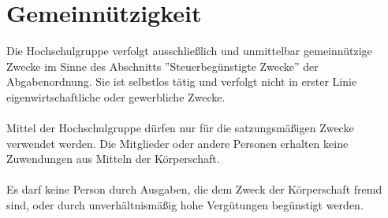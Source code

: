 \documentclass[11pt]{article}
\begin{document}
\section{Gemeinnützigkeit}
Die Hochschulgruppe verfolgt ausschließlich und unmittelbar gemeinnützige Zwecke im Sinne
des Abschnitts ''Steuerbegünstigte Zwecke'' der Abgabenordnung. Sie ist selbstlos tätig und verfolgt
nicht in erster Linie eigenwirtschaftliche oder gewerbliche Zwecke.\\\\
Mittel der Hochschulgruppe dürfen nur für die satzungsmäßigen Zwecke verwendet werden. Die
Mitglieder oder andere Personen erhalten keine Zuwendungen aus Mitteln der Körperschaft.\\\\
Es darf keine Person durch Ausgaben, die dem Zweck der Körperschaft fremd sind, oder durch
unverhältnismäßig hohe Vergütungen begünstigt werden.
\end{document}
